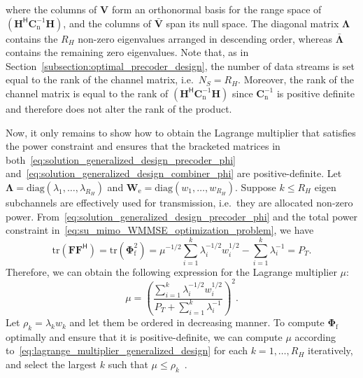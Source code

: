 where the columns of $\mathbf{V}$ form an orthonormal basis for the range space of $(\mathbf{H}^{\mathsf{H}} \mathbf{C}_{\mathrm{n}}^{-1} \mathbf{H})$, and the columns of $\bar{\mathbf{V}}$ span its null space.
The diagonal matrix $\mathbf{\Lambda}$ contains the $R_H$ non-zero eigenvalues arranged in descending order, whereas $\bar{\mathbf{\Lambda}}$ contains the remaining zero eigenvalues.
Note that, as in Section~\ref{subsection:optimal_precoder_design}, the number of data streams is set equal to the rank of the channel matrix, i.e.\ $N_S = R_H$. Moreover, the rank of the channel matrix is equal to the rank of $(\mathbf{H}^{\mathsf{H}} \mathbf{C}_{\mathrm{n}}^{-1} \mathbf{H})$ since $\mathbf{C}_{\mathrm{n}}^{-1}$ is positive definite and therefore does not alter the rank of the product.

Now, it only remains to show how to obtain the Lagrange multiplier that satisfies the power constraint and ensures that the bracketed matrices in both~\eqref{eq:solution_generalized_design_precoder_phi} and~\eqref{eq:solution_generalized_design_combiner_phi} are positive-definite.
Let $\mathbf{\Lambda} = \mathrm{diag}(\lambda_1, \dots, \lambda_{R_H})$ and $\mathbf{W}_{\mathrm{e}} = \mathrm{diag}(w_1, \dots, w_{R_H})$.
Suppose $k \leq R_H$ eigen subchannels are effectively used for transmission, i.e.\ they are allocated non-zero power.
From~\eqref{eq:solution_generalized_design_precoder_phi} and the total power constraint in~\eqref{eq:su_mimo_WMMSE_optimization_problem}, we have
\begin{equation}
\label{eq:power_constraint_generalized_design}
    \mathrm{tr}(\mathbf{F}\mathbf{F}^{\mathsf{H}}) = \mathrm{tr}(\mathbf{\Phi}_{\mathrm{f}}^2) = \mu^{-1/2} \sum_{i=1}^k \lambda_i^{-1/2} w^{1/2}_i - \sum_{i=1}^k \lambda_i^{-1} = P_T.
\end{equation}
Therefore, we can obtain the following expression for the Lagrange multiplier $\mu$:
\begin{equation}
\label{eq:lagrange_multiplier_generalized_design}
    \mu = \left( \frac{\sum_{i=1}^k \lambda_i^{-1/2} w^{1/2}_i}{P_T + \sum_{i=1}^k \lambda_i^{-1}} \right)^2.
\end{equation}
Let $\rho_k = \lambda_k w_k$ and let them be ordered in decreasing manner. To compute $\mathbf{\Phi}_{\mathrm{f}}$ optimally and ensure that it is positive-definite, we can compute $\mu$ according to~\eqref{eq:lagrange_multiplier_generalized_design} for each $k = 1, \dots, R_H$ iteratively, and select the largest $k$ such that $\mu \leq \rho_k$~\cite{su_mimo_joint_precoder_decoder_design}.



